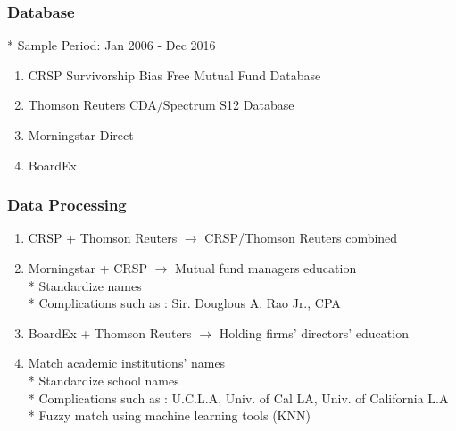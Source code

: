 \documentclass{beamer}
\begin{document}
\begin{frame}
\frametitle{Database}
 * Sample Period: Jan 2006 - Dec 2016
\begin{enumerate}
\item CRSP Survivorship Bias Free Mutual Fund Database
\item Thomson Reuters CDA/Spectrum S12 Database
\item Morningstar Direct
\item BoardEx
\end{enumerate}
\end{frame}

\begin{frame}
\frametitle{Data Processing}
\begin{enumerate}
\item CRSP + Thomson Reuters $\rightarrow$ CRSP/Thomson Reuters combined
\item Morningstar + CRSP  $\rightarrow$ Mutual fund managers education
\\ * Standardize names
\\ * Complications such as : Sir. Douglous A. Rao Jr., CPA
\item BoardEx + Thomson Reuters  $\rightarrow$ Holding firms' directors' education
\item Match academic institutions' names
\\ * Standardize school names
\\ * Complications such as : U.C.L.A, Univ. of Cal LA, Univ. of California L.A
\\ * Fuzzy match using machine learning tools (KNN)
\end{enumerate}
\end{frame}
\end{document}
